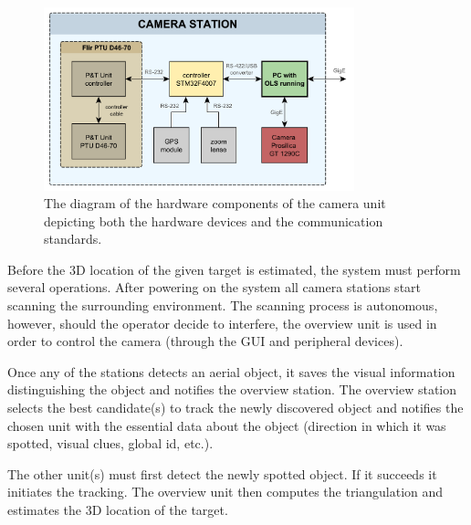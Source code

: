 \begin{figure}[htb]
	\centering
	\includegraphics[width=9cm]{fig/hw_camera_unit.pdf}
	\caption{The diagram of the hardware components of the camera unit depicting both the hardware devices and the communication standards.}
	\label{fig:hw_camera_unit}
\end{figure}

Before the 3D location of the given target is estimated, the system must perform several operations. After powering on the system all camera stations start scanning the surrounding environment. The scanning process is autonomous, however, should the operator decide to interfere, the overview unit is used in order to control the camera (through the GUI and peripheral devices). 

Once any of the stations detects an aerial object, it saves the visual information distinguishing the object and notifies the overview station. The overview station selects the best candidate(s) to track the newly discovered object and notifies the chosen unit with the essential data about the object (direction in which it was spotted, visual clues, global id, etc.).

The other unit(s) must first detect the newly spotted object. If it succeeds it initiates the tracking. The overview unit then computes the triangulation and estimates the 3D location of the target.

